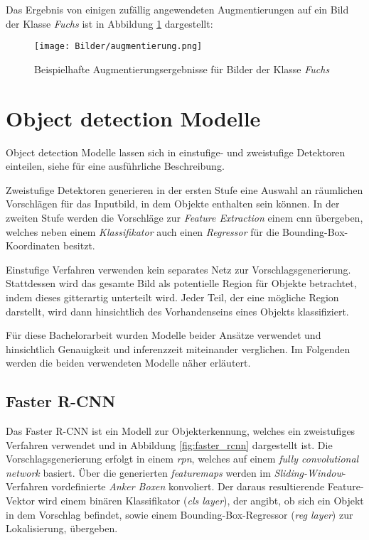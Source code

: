 Das Ergebnis von einigen zufällig angewendeten Augmentierungen 
auf ein Bild der Klasse \textit{Fuchs} ist
in Abbildung \ref{fig:augmentierung} dargestellt:

\begin{figure}[H]
    \centering
    \texttt{[image: Bilder/augmentierung.png]}
    \caption{Beispielhafte Augmentierungsergebnisse 
    für Bilder der Klasse \textit{Fuchs}}
    \label{fig:augmentierung}
\end{figure}


\section{Object detection Modelle}

Object detection Modelle lassen sich
in einstufige- und zweistufige Detektoren einteilen,
siehe \cite{wuRecentAdvancesDeep2019} für eine 
ausführliche Beschreibung.

Zweistufige Detektoren generieren in der 
ersten Stufe eine Auswahl an räumlichen Vorschlägen
für das Inputbild, in dem Objekte enthalten sein 
können. 
In der zweiten Stufe werden die Vorschläge zur \textit{Feature 
Extraction} einem \Gls{cnn} übergeben, welches neben 
einem \textit{Klassifikator} auch einen \textit{Regressor} für 
die Bounding-Box-Koordinaten besitzt.

Einstufige Verfahren verwenden kein separates 
Netz zur Vorschlagsgenerierung. Stattdessen 
wird das gesamte Bild als potentielle
Region für Objekte betrachtet, indem 
dieses gitterartig unterteilt wird.
Jeder Teil, der eine mögliche Region darstellt, 
wird dann hinsichtlich des Vorhandenseins 
eines Objekts klassifiziert.

Für diese Bachelorarbeit wurden 
Modelle beider Ansätze verwendet und 
hinsichtlich Genauigkeit und 
\Gls{inferenz}zeit miteinander verglichen.
Im Folgenden werden die beiden 
verwendeten Modelle näher erläutert.


\subsection*{Faster R-CNN}

Das Faster R-CNN \cite{renFasterRCNNRealTime2016a} 
ist ein Modell zur Objekterkennung, welches
ein zweistufiges Verfahren verwendet und 
in Abbildung \ref{fig:faster_rcnn} 
dargestellt ist.
Die Vorschlagsgenerierung erfolgt in einem 
\textit{\Gls{rpn}}, welches auf 
einem \textit{fully convolutional network} 
basiert.
Über die generierten \textit{\Glspl{featuremap}} werden im 
\textit{Sliding-Window}-Verfahren vordefinierte
\textit{Anker Boxen} konvoliert.
Der daraus resultierende Feature-Vektor wird 
einem binären Klassifikator (\textit{cls layer}),
der angibt, ob sich ein Objekt
in dem Vorschlag befindet, 
sowie einem Bounding-Box-Regressor
(\textit{reg layer}) zur Lokalisierung,
übergeben.

